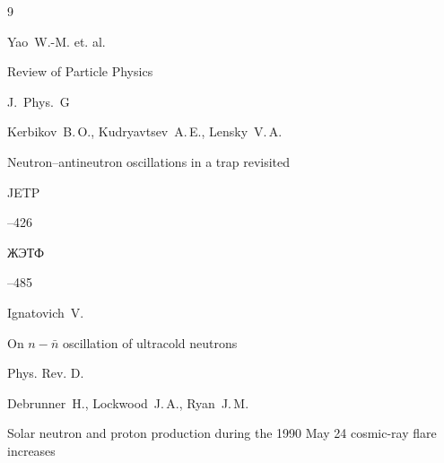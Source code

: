 \begin{thebibliography}{9}

\by Yao~W.-M. et. al.

\paper Review of Particle Physics 


\jour J.~Phys.~G













\by Kerbikov~B.\,O., Kudryavtsev~A.\,E., Lensky~V.\,A.

\paper Neutron--antineutron oscillations in a trap revisited

\jour JETP




--426


\morerref

\jour ЖЭТФ




--485




\by Ignatovich~V.

\paper On $n{-}\bar  n$ oscillation of  ultracold neutrons

\jour Phys. Rev. D.












\by Debrunner~H., Lockwood~J.\,A., Ryan~J.\,M.

\paper Solar neutron and  proton production during the 1990 May 24 cosmic-ray flare increases


\end{thebibliography}

